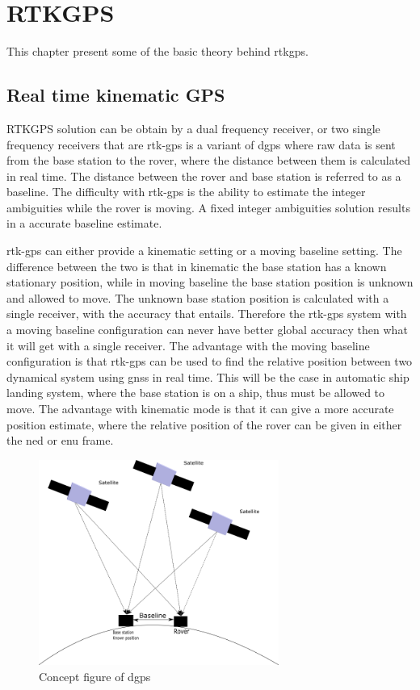 \chapter{RTKGPS}
This chapter present some of the basic theory behind rtkgps.


\section{Real time kinematic GPS}\label{ss:rtk-gps}
RTKGPS solution can be obtain by a dual frequency receiver, or two single frequency receivers that are
\acrfull{rtk-gps} is a variant of \gls{dgps} where raw data is sent from the base station to the rover, where the distance between them is calculated in real time.
The distance between the rover and base station is referred to as a baseline. The difficulty with \gls{rtk-gps} is the ability to estimate the integer ambiguities while the rover is moving. A fixed integer ambiguities solution results in a accurate baseline estimate.

\gls{rtk-gps} can either provide a kinematic setting or a moving baseline setting. The difference between the two is that in kinematic the base station has a known stationary position, while in moving baseline the base station position is unknown and allowed to move. The unknown base station position is calculated with a single receiver, with the accuracy that entails. Therefore the \gls{rtk-gps} system with a moving baseline configuration can never have better global accuracy then what it will get with a single receiver. The advantage with the moving baseline configuration is that \gls{rtk-gps} can be used to find the relative position between two dynamical system using \gls{gnss} in real time. This will be the case in automatic ship landing system, where the base station is on a ship, thus must be allowed to move. The advantage with kinematic mode is that it can give a more accurate position estimate, where the relative position of the rover can be given in either the \gls{ned} or \gls{enu} frame.

\begin{figure}[H]
	\centering
		\includegraphics[width=0.7\textwidth]{figs/DGPS.png}
		\caption{Concept figure of \acrfull{dgps}}
		\label{figure:DGPS}
\end{figure}
